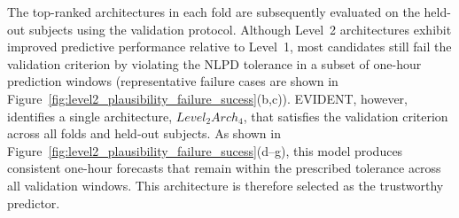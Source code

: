 \documentclass[preprint,12pt]{elsarticle}
\begin{document}
The top-ranked architectures in each fold are subsequently evaluated on the held-out subjects using the validation protocol. Although Level~2 architectures exhibit improved predictive performance relative to Level~1, most candidates still fail the validation criterion by violating the NLPD tolerance in a subset of one-hour prediction windows (representative failure cases are shown in Figure~\ref{fig:level2_plausibility_failure_sucess}(b,c)).
EVIDENT, however, identifies a single architecture, \(Level_2Arch_4\), that satisfies the validation criterion across all folds and held-out subjects. As shown in Figure~\ref{fig:level2_plausibility_failure_sucess}(d--g), this model produces consistent one-hour forecasts that remain within the prescribed tolerance across all validation windows. This architecture is therefore selected as the trustworthy predictor.
\end{document}
